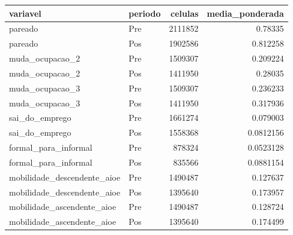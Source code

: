 \begin{tabular}{llrr}
\toprule
variavel & periodo & celulas & media\_ponderada \\
\midrule
pareado & Pre & 2111852 & 0.78335 \\
pareado & Pos & 1902586 & 0.812258 \\
muda\_ocupacao\_2 & Pre & 1509307 & 0.209224 \\
muda\_ocupacao\_2 & Pos & 1411950 & 0.28035 \\
muda\_ocupacao\_3 & Pre & 1509307 & 0.236233 \\
muda\_ocupacao\_3 & Pos & 1411950 & 0.317936 \\
sai\_do\_emprego & Pre & 1661274 & 0.079003 \\
sai\_do\_emprego & Pos & 1558368 & 0.0812156 \\
formal\_para\_informal & Pre & 878324 & 0.0523128 \\
formal\_para\_informal & Pos & 835566 & 0.0881154 \\
mobilidade\_descendente\_aioe & Pre & 1490487 & 0.127637 \\
mobilidade\_descendente\_aioe & Pos & 1395640 & 0.173957 \\
mobilidade\_ascendente\_aioe & Pre & 1490487 & 0.128724 \\
mobilidade\_ascendente\_aioe & Pos & 1395640 & 0.174499 \\
\bottomrule
\end{tabular}
